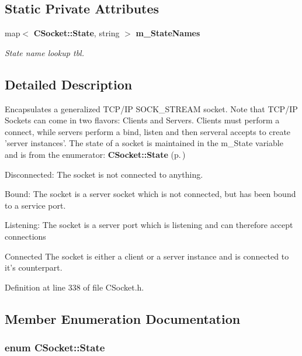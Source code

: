 \subsection*{Static Private Attributes}
\begin{CompactItemize}
\item 
map$<$ {\bf CSocket::State}, string $>$ {\bf m\_\-State\-Names}
\begin{CompactList}\small\item\em State name lookup tbl.\item\end{CompactList}\end{CompactItemize}


\subsection{Detailed Description}
Encapsulates a generalized TCP/IP SOCK\_\-STREAM socket.  Note that TCP/IP Sockets can come in two flavors: Clients and Servers. Clients must perform a connect, while servers perform a bind, listen and then serveral accepts to create 'server instances'. The state of a socket is maintained in the m\_\-State variable and is from the enumerator: {\bf CSocket::State} {\rm (p.\,\pageref{classCSocket_s4})}

\begin{CompactItemize}
\item 
Disconnected: The socket is not connected to anything.\item 
Bound: The socket is a server socket which is not connected, but has been bound to a service port.\item 
Listening: The socket is a server port which is listening and can therefore accept connections\item 
Connected The socket is either a client or a  server instance and is connected to it's counterpart. \end{CompactItemize}




Definition at line 338 of file CSocket.h.

\subsection{Member Enumeration Documentation}
\subsubsection{\setlength{\rightskip}{0pt plus 5cm}enum CSocket::State}\label{classCSocket_s4}


